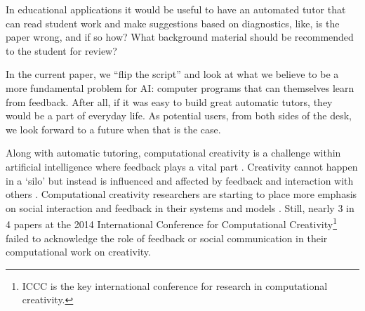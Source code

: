 %
%
%
%

%
%

In educational applications it would be useful to have an automated tutor that can read student work and make suggestions based on diagnostics, like, is the paper wrong, and if so how?  What background material should be recommended to the student for review?

In the current paper, we ``flip the script'' and look at what we believe to be a more fundamental problem for AI: computer programs that can themselves learn from feedback.  After all, if it was easy to build great automatic tutors, they would be a part of everyday life.  As potential users, from both sides of the desk, we look forward to a future when that is the case.

Along with automatic tutoring, computational creativity is a challenge within artificial intelligence where feedback plays a vital part \cite<for example>{perezyperez10MM,pease10}. Creativity cannot happen in a `silo' but instead is influenced and affected by feedback and interaction with others \cite{csik88,saunders2012towards}. Computational creativity researchers are starting to place more emphasis on social interaction and feedback in their systems and models \cite{saunders2012towards,gervas2014reading,corneli15iccc}. Still, nearly 3 in 4 papers at the 2014 International Conference for Computational Creativity\footnote{ICCC is  the key international conference for research in computational creativity.} failed to acknowledge the role of feedback or social communication in their computational work on creativity. 

